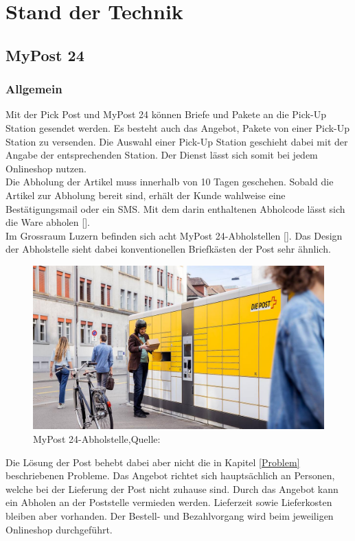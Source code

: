 \section{Stand der Technik}\label{StandDerTechnik}
\subsection{MyPost 24}
\subsubsection{Allgemein}
Mit der Pick Post und MyPost 24 können Briefe und Pakete an die Pick-Up Station gesendet werden. Es besteht auch das Angebot, Pakete von einer Pick-Up Station zu versenden. 
Die Auswahl einer Pick-Up Station geschieht dabei mit der Angabe der entsprechenden Station. Der Dienst lässt sich somit bei jedem Onlineshop nutzen.\\
Die Abholung der Artikel muss innerhalb von 10 Tagen geschehen. Sobald die Artikel zur Abholung bereit sind, erhält der Kunde wahlweise eine Bestätigungsmail oder ein SMS. Mit dem darin enthaltenen Abholcode lässt sich die Ware abholen [\cite{postPickUp}].\\

Im Grossraum Luzern befinden sich acht MyPost 24-Abholstellen [\cite{myPost24Stations}]. 
Das Design der Abholstelle sieht dabei konventionellen Briefkästen der Post sehr ähnlich. 
\begin{figure}[H]
	\centering
	\includegraphics[width=1\textwidth]{images/myPostImage.jpg}
	\caption[MyPost 24-Abholstelle]{MyPost 24-Abholstelle,Quelle: \cite{myPost24StationsImage}}
	\label{img: My Post 24-Abholstelle}
\end{figure}
Die Lösung der Post behebt dabei aber nicht die in Kapitel \ref{Problem} beschriebenen Probleme. Das Angebot richtet sich hauptsächlich an Personen, welche bei der Lieferung der Post nicht zuhause sind. Durch das Angebot kann ein Abholen an der Poststelle vermieden werden. Lieferzeit sowie Lieferkosten bleiben aber vorhanden. Der Bestell- und Bezahlvorgang wird beim jeweiligen Onlineshop durchgeführt. 
\newpage 
